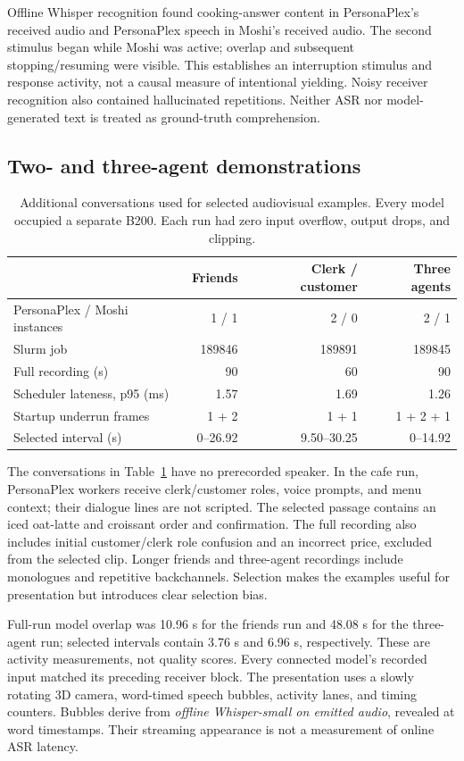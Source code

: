 \documentclass{article}
\begin{document}
Offline Whisper recognition \citep{radford2023whisper} found cooking-answer content in PersonaPlex's received audio and PersonaPlex speech in Moshi's received audio. The second stimulus began while Moshi was active; overlap and subsequent stopping/resuming were visible. This establishes an interruption stimulus and response activity, not a causal measure of intentional yielding. Noisy receiver recognition also contained hallucinated repetitions. Neither ASR nor model-generated text is treated as ground-truth comprehension.

\subsection{Two- and three-agent demonstrations}
\begin{table}[t]
\centering
\caption{Additional conversations used for selected audiovisual examples. Every model occupied a separate B200. Each run had zero input overflow, output drops, and clipping.}
\label{tab:showcase}
\begin{tabular}{lrrr}\toprule
 & Friends & Clerk / customer & Three agents\\\midrule
PersonaPlex / Moshi instances & 1 / 1 & 2 / 0 & 2 / 1\\
Slurm job & 189846 & 189891 & 189845\\
Full recording (s) & 90 & 60 & 90\\
Scheduler lateness, p95 (ms) & 1.57 & 1.69 & 1.26\\
Startup underrun frames & 1 + 2 & 1 + 1 & 1 + 2 + 1\\
Selected interval (s) & 0--26.92 & 9.50--30.25 & 0--14.92\\\bottomrule
\end{tabular}
\end{table}

The conversations in Table~\ref{tab:showcase} have no prerecorded speaker. In the cafe run, PersonaPlex workers receive clerk/customer roles, voice prompts, and menu context; their dialogue lines are not scripted. The selected passage contains an iced oat-latte and croissant order and confirmation. The full recording also includes initial customer/clerk role confusion and an incorrect price, excluded from the selected clip. Longer friends and three-agent recordings include monologues and repetitive backchannels. Selection makes the examples useful for presentation but introduces clear selection bias.

Full-run model overlap was 10.96 s for the friends run and 48.08 s for the three-agent run; selected intervals contain 3.76 s and 6.96 s, respectively. These are activity measurements, not quality scores. Every connected model's recorded input matched its preceding receiver block. The presentation uses a slowly rotating 3D camera, word-timed speech bubbles, activity lanes, and timing counters. Bubbles derive from \emph{offline Whisper-small on emitted audio}, revealed at word timestamps. Their streaming appearance is not a measurement of online ASR latency.
\end{document}
